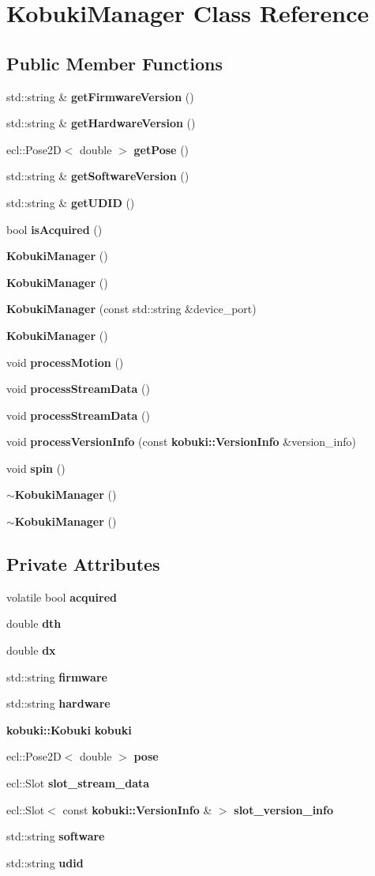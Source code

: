 \section{\-Kobuki\-Manager \-Class \-Reference}
\label{classKobukiManager}
\subsection*{\-Public \-Member \-Functions}
\begin{DoxyCompactItemize}
\item 
std\-::string \& {\bf get\-Firmware\-Version} ()
\item 
std\-::string \& {\bf get\-Hardware\-Version} ()
\item 
ecl\-::\-Pose2\-D$<$ double $>$ {\bf get\-Pose} ()
\item 
std\-::string \& {\bf get\-Software\-Version} ()
\item 
std\-::string \& {\bf get\-U\-D\-I\-D} ()
\item 
bool {\bf is\-Acquired} ()
\item 
{\bf \-Kobuki\-Manager} ()
\item 
{\bf \-Kobuki\-Manager} ()
\item 
{\bf \-Kobuki\-Manager} (const std\-::string \&device\-\_\-port)
\item 
{\bf \-Kobuki\-Manager} ()
\item 
void {\bf process\-Motion} ()
\item 
void {\bf process\-Stream\-Data} ()
\item 
void {\bf process\-Stream\-Data} ()
\item 
void {\bf process\-Version\-Info} (const {\bf kobuki\-::\-Version\-Info} \&version\-\_\-info)
\item 
void {\bf spin} ()
\item 
{\bf $\sim$\-Kobuki\-Manager} ()
\item 
{\bf $\sim$\-Kobuki\-Manager} ()
\end{DoxyCompactItemize}
\subsection*{\-Private \-Attributes}
\begin{DoxyCompactItemize}
\item 
volatile bool {\bf acquired}
\item 
double {\bf dth}
\item 
double {\bf dx}
\item 
std\-::string {\bf firmware}
\item 
std\-::string {\bf hardware}
\item 
{\bf kobuki\-::\-Kobuki} {\bf kobuki}
\item 
ecl\-::\-Pose2\-D$<$ double $>$ {\bf pose}
\item 
ecl\-::\-Slot {\bf slot\-\_\-stream\-\_\-data}
\item 
ecl\-::\-Slot$<$ const \*
{\bf kobuki\-::\-Version\-Info} \& $>$ {\bf slot\-\_\-version\-\_\-info}
\item 
std\-::string {\bf software}
\item 
std\-::string {\bf udid}
\end{DoxyCompactItemize}


